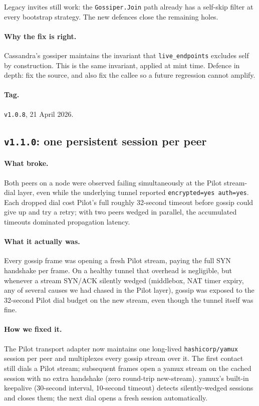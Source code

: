 \documentclass[11pt,a4paper]{article}
\begin{document}
Legacy invites still work: the \texttt{Gossiper.Join} path
already has a self-skip filter at every bootstrap strategy. The
new defences close the remaining holes.

\paragraph{Why the fix is right.} Cassandra's gossiper
maintains the invariant that \texttt{live\_endpoints} excludes
self by construction. This is the same invariant, applied at
mint time. Defence in depth: fix the source, and also fix the
callee so a future regression cannot amplify.

\paragraph*{Tag.} \texttt{v1.0.8}, 21 April 2026.

\subsection{\texttt{v1.1.0}: one persistent session per peer}

\paragraph{What broke.} Both peers on a node were observed
failing simultaneously at the Pilot stream-dial layer, even while
the underlying tunnel reported \texttt{encrypted=yes auth=yes}.
Each dropped dial cost Pilot's full roughly 32-second timeout
before gossip could give up and try a retry; with two peers
wedged in parallel, the accumulated timeouts dominated
propagation latency.

\paragraph{What it actually was.} Every gossip frame was opening
a fresh Pilot stream, paying the full SYN handshake per frame.
On a healthy tunnel that overhead is negligible, but whenever a
stream SYN/ACK silently wedged (middlebox, NAT timer expiry,
any of several causes we had chased in the Pilot layer), gossip
was exposed to the 32-second Pilot dial budget on the new
stream, even though the tunnel itself was fine.

\paragraph{How we fixed it.} The Pilot transport adapter now
maintains one long-lived \texttt{hashicorp/yamux} session per
peer and multiplexes every gossip stream over it. The first
contact still dials a Pilot stream; subsequent frames open a
yamux stream on the cached session with no extra handshake
(zero round-trip new-stream). yamux's built-in keepalive (30-second
interval, 10-second timeout) detects silently-wedged sessions
and closes them; the next dial opens a fresh session
automatically.
\end{document}
